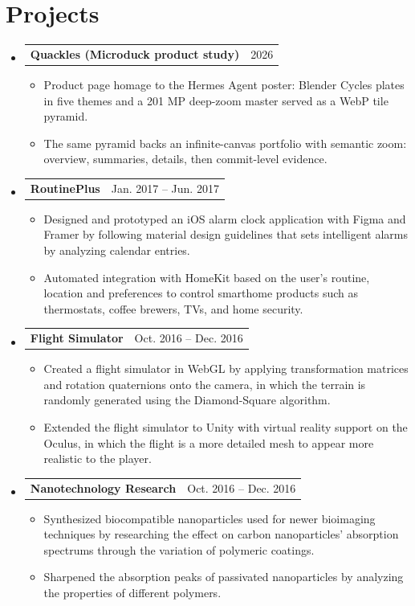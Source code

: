\documentclass[letterpaper,11pt]{article}
\makeatletter
\newcommand{\resumeItem}[1]{\item\small{#1 \vspace{-2pt}}}
\newcommand{\resumeProjectHeading}[2]{%
    \item
    \begin{tabular*}{0.97\textwidth}{l@{\extracolsep{\fill}}r}
      \small#1 & #2 \\
    \end{tabular*}\vspace{-7pt}
}
\newcommand{\resumeSubHeadingListStart}{\begin{itemize}[leftmargin=0.15in, label={}]}
\newcommand{\resumeSubHeadingListEnd}{\end{itemize}}
\newcommand{\resumeItemListStart}{\begin{itemize}}
\newcommand{\resumeItemListEnd}{\end{itemize}\vspace{-5pt}}
\makeatother
\begin{document}
\section{Projects}
  \resumeSubHeadingListStart
      \resumeProjectHeading
          {\textbf{Quackles (Microduck product study)}}{2026}
          \resumeItemListStart
            \resumeItem{Product page homage to the Hermes Agent poster: Blender Cycles plates in five themes and a 201 MP deep-zoom master served as a WebP tile pyramid.}
            \resumeItem{The same pyramid backs an infinite-canvas portfolio with semantic zoom: overview, summaries, details, then commit-level evidence.}
          \resumeItemListEnd
      \resumeProjectHeading
          {\textbf{RoutinePlus}}{Jan. 2017 -- Jun. 2017}
          \resumeItemListStart
            \resumeItem{Designed and prototyped an iOS alarm clock application with Figma and Framer by following material design guidelines that sets intelligent alarms by analyzing calendar entries.}
            \resumeItem{Automated integration with HomeKit based on the user's routine, location and preferences to control smarthome products such as thermostats, coffee brewers, TVs, and home security.}
          \resumeItemListEnd
      \resumeProjectHeading
          {\textbf{Flight Simulator}}{Oct. 2016 -- Dec. 2016}
          \resumeItemListStart
            \resumeItem{Created a flight simulator in WebGL by applying transformation matrices and rotation quaternions onto the camera, in which the terrain is randomly generated using the Diamond-Square algorithm.}
            \resumeItem{Extended the flight simulator to Unity with virtual reality support on the Oculus, in which the flight is a more detailed mesh to appear more realistic to the player.}
          \resumeItemListEnd
      \resumeProjectHeading
          {\textbf{Nanotechnology Research}}{Oct. 2016 -- Dec. 2016}
          \resumeItemListStart
            \resumeItem{Synthesized biocompatible nanoparticles used for newer bioimaging techniques by researching the effect on carbon nanoparticles' absorption spectrums through the variation of polymeric coatings.}
            \resumeItem{Sharpened the absorption peaks of passivated nanoparticles by analyzing the properties of different polymers.}
          \resumeItemListEnd
  \resumeSubHeadingListEnd
\end{document}
